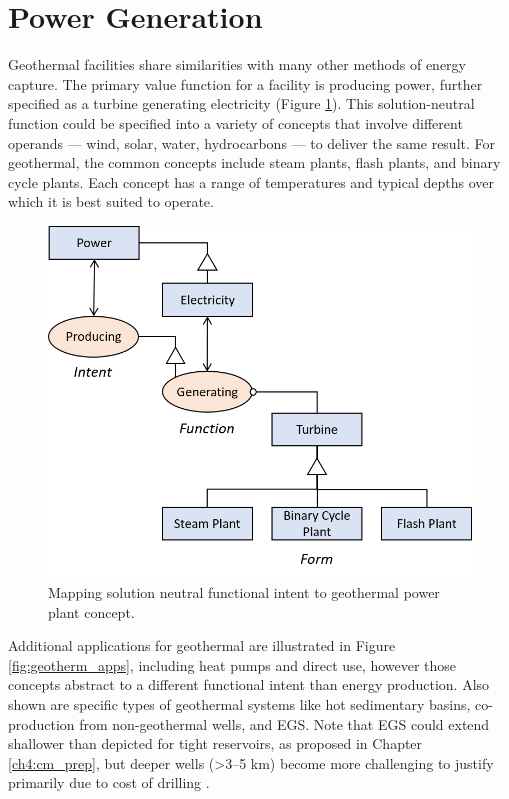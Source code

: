 \section{Power Generation}\label{ch2:power_gen}
Geothermal facilities share similarities with many other methods of energy capture. The primary value function for a facility is producing power, further specified as a turbine generating electricity (Figure \ref{fig:solution_neutral}). This solution-neutral function could be specified into a variety of concepts that involve different operands --- wind, solar, water, hydrocarbons --- to deliver the same result. For geothermal, the common concepts include steam plants, flash plants, and binary cycle plants. Each concept has a range of temperatures and typical depths over which it is best suited to operate.
\begin{figure}[H]
\centering
\includegraphics[width=.6\linewidth]{templates/images/Figure-PowerProduction-SolutionNeutral.png}
\singlespacing
\caption[Intent to concept for geothermal power plants]{Mapping solution neutral functional intent to geothermal power plant concept.}
\label{fig:solution_neutral}
\end{figure}
Additional applications for geothermal are illustrated in Figure \ref{fig:geotherm_apps}, including heat pumps and direct use, however those concepts abstract to a different functional intent than energy production. Also shown are specific types of geothermal systems like hot sedimentary basins, co-production from non-geothermal wells, and EGS. Note that EGS could extend shallower than depicted for tight reservoirs, as proposed in Chapter \ref{ch4:cm_prep}, but deeper wells (>3--5 km) become more challenging to justify primarily due to cost of drilling \citep{moore_more_2013}.

